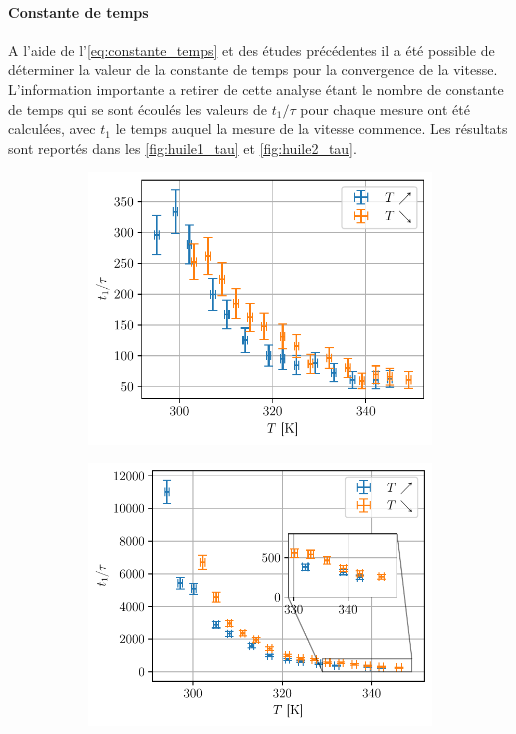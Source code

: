 \paragraph{Constante de temps} A l'aide de l'\autoref{eq:constante_temps} et des études précédentes il a été possible de déterminer la valeur de la constante de temps pour la convergence de la vitesse. L'information importante a retirer de cette analyse étant le nombre de constante de temps qui se sont écoulés les valeurs de $t_1/\tau$ pour chaque mesure ont été calculées, avec $t_1$ le temps auquel la mesure de la vitesse commence. Les résultats sont reportés dans les \autoref{fig:huile1_tau} et \autoref{fig:huile2_tau}.
\begin{figure}[H]
    \centering
    \begin{subfigure}{0.48\linewidth}
        \centering
        \includegraphics[width=\linewidth]{figures/huile1_tau.pdf}
        \caption{}
        \label{fig:huile1_tau}
    \end{subfigure}
    \begin{subfigure}{0.48\linewidth}
        \centering
        \includegraphics[width=\linewidth]{figures/huile2_tau.pdf}

\end{subfigure}
\end{figure}
